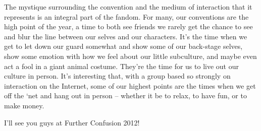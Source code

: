 The mystique surrounding the convention and the medium of interaction that it represents is an integral part of the fandom.  For many, our conventions are the high point of the year, a time to both see friends we rarely get the chance to see and blur the line between our selves and our characters.  It's the time when we get to let down our guard somewhat and show some of our back-stage selves, show some emotion with how we feel about our little subculture, and maybe even act a fool in a giant animal costume.  They're the time for us to live out our culture in person.  It's interesting that, with a group based so strongly on interaction on the Internet, some of our highest points are the times when we get off the ‘net and hang out in person -- whether it be to relax, to have fun, or to make money.

I'll see you guys at Further Confusion 2012!
